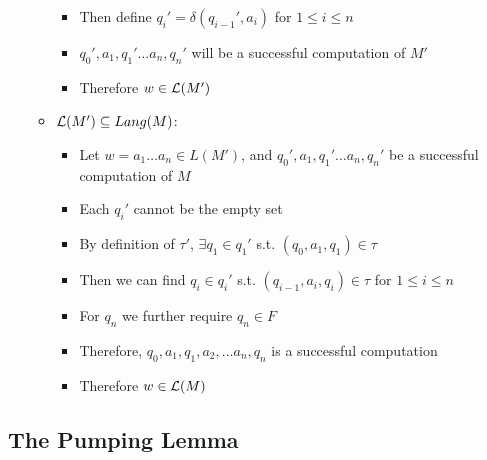 \begin{itemize}
\begin{itemize}
\begin{itemize}
			\item Then define $ q_i' = \delta(q_{i-1}', a_i) $ for $ 1 \le i \le n $
			
			\item $ q_0', a_1, q_1' \dots a_n, q_n' $ will be a successful computation of $ M' $
			
			\item Therefore $ w \in \mathcal{L}(M') $
		\end{itemize}
	
	\item $ \mathcal{L}(M') \subseteq Lang(M) $:
	
	\begin{itemize}
		\item Let $ w = a_1 \dots a_n \in L(M') $, and $  q_0', a_1, q_1' \dots a_n, q_n' $ be a successful computation of $ M $
		
		\item Each $ q_i' $ cannot be the empty set
		
		\item By definition of $ \tau' $, $ \exists q_1 \in q_1' $ s.t. $ (q_0, a_1, q_1) \in \tau $
		
		\item Then we can find $ q_i \in q_i' $ s.t. $ (q_{i-1}, a_i, q_i) \in \tau $ for $ 1 \le i \le n $
		
		\item For $ q_n $ we further require $ q_n \in F $
		
		\item Therefore, $ q_0, a_1, q_1, a_2, \dots a_n, q_n $ is a successful computation
		
		\item Therefore $ w \in \mathcal{L}(M) $
	\end{itemize}
	
	\end{itemize}
	
\end{itemize}

\clearpage

\subsection{The Pumping Lemma}

